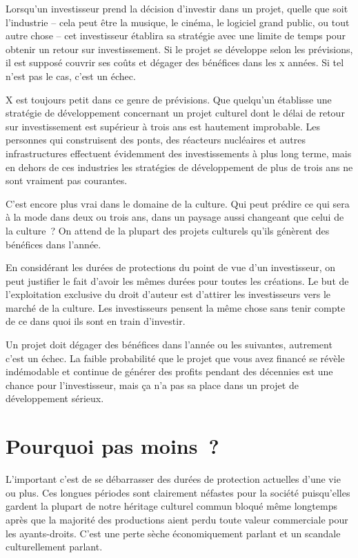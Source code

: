 Lorsqu’un investisseur prend la décision d’investir dans un projet, quelle que soit l’industrie – cela
peut être la musique, le cinéma, le logiciel grand public, ou tout autre chose – cet investisseur
établira sa stratégie avec une limite de temps pour obtenir un retour sur investissement. Si le
projet se développe selon les prévisions, il est supposé couvrir ses coûts et dégager des bénéfices
dans les x années. Si tel n’est pas le cas, c’est un échec.

X est toujours petit dans ce genre de prévisions. Que quelqu’un établisse une stratégie de
développement concernant un projet culturel dont le délai de retour sur investissement est supérieur
à trois ans est hautement improbable. Les personnes qui construisent des ponts, des réacteurs
nucléaires et autres infrastructures effectuent évidemment des investissements à plus long terme,
mais en dehors de ces industries les stratégies de développement de plus de trois ans ne sont
vraiment pas courantes.

C’est encore plus vrai dans le domaine de la culture. Qui peut prédire ce qui sera à la mode dans
deux ou trois ans, dans un paysage aussi changeant que celui de la culture~? On attend de la plupart
des projets culturels qu’ils génèrent des bénéfices dans l’année.

En considérant les durées de protections du point de vue d’un investisseur, on peut justifier le
fait d’avoir les mêmes durées pour toutes les créations. Le but de l’exploitation exclusive du droit
d’auteur est d’attirer les investisseurs vers le marché de la culture. Les investisseurs pensent
la même chose sans tenir compte de ce dans quoi ils sont en train d’investir.

Un projet doit dégager des bénéfices dans l’année ou les suivantes, autrement
c’est un échec. La faible probabilité que le projet que vous avez financé se révèle indémodable et
continue de générer des profits pendant des décennies est une chance pour l’investisseur, mais ça
n’a pas sa place dans un projet de développement sérieux.

\section{Pourquoi pas moins~?}

L’important c’est de se débarrasser des durées de protection actuelles d’une vie ou plus. Ces
longues périodes sont clairement néfastes pour la société puisqu’elles gardent la plupart de notre
héritage culturel commun bloqué même longtemps après que la majorité des productions aient perdu
toute valeur commerciale pour les ayants-droits. C’est une perte sèche économiquement parlant et un
scandale culturellement parlant.

